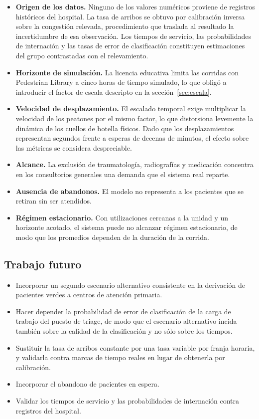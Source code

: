 \documentclass{article}
\begin{document}
\begin{itemize}
  \item \textbf{Origen de los datos.} Ninguno de los valores numéricos
  proviene de registros históricos del hospital. La tasa de arribos se obtuvo
  por calibración inversa sobre la congestión relevada, procedimiento que
  traslada al resultado la incertidumbre de esa observación. Los tiempos de
  servicio, las probabilidades de internación y las tasas de error de
  clasificación constituyen estimaciones del grupo contrastadas con el
  relevamiento.
  \item \textbf{Horizonte de simulación.} La licencia educativa limita las
  corridas con Pedestrian Library a cinco horas de tiempo simulado, lo que
  obligó a introducir el factor de escala descripto en la
  sección~\ref{sec:escala}.
  \item \textbf{Velocidad de desplazamiento.} El escalado temporal exige
  multiplicar la velocidad de los peatones por el mismo factor, lo que
  distorsiona levemente la dinámica de los cuellos de botella físicos. Dado
  que los desplazamientos representan segundos frente a esperas de decenas de
  minutos, el efecto sobre las métricas se considera despreciable.
  \item \textbf{Alcance.} La exclusión de traumatología, radiografías y
  medicación concentra en los consultorios generales una demanda que el
  sistema real reparte.
  \item \textbf{Ausencia de abandonos.} El modelo no representa a los
  pacientes que se retiran sin ser atendidos.
  \item \textbf{Régimen estacionario.} Con utilizaciones cercanas a la unidad
  y un horizonte acotado, el sistema puede no alcanzar régimen estacionario,
  de modo que los promedios dependen de la duración de la corrida.
\end{itemize}

\subsection{Trabajo futuro}

\begin{itemize}
  \item Incorporar un segundo escenario alternativo consistente en la
  derivación de pacientes verdes a centros de atención primaria.
  \item Hacer depender la probabilidad de error de clasificación de la carga
  de trabajo del puesto de triage, de modo que el escenario alternativo
  incida también sobre la calidad de la clasificación y no sólo sobre los
  tiempos.
  \item Sustituir la tasa de arribos constante por una tasa variable por
  franja horaria, y validarla contra marcas de tiempo reales en lugar de
  obtenerla por calibración.
  \item Incorporar el abandono de pacientes en espera.
  \item Validar los tiempos de servicio y las probabilidades de internación
  contra registros del hospital.
\end{itemize}
\end{document}
